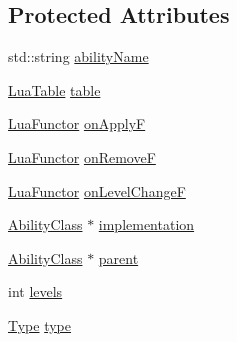 \subsection*{Protected Attributes}
\begin{DoxyCompactItemize}
\item 
std\+::string \hyperlink{classZeta_1_1AbilityClass_af998b8b5d45ef4853cfac4afe78aff4d}{ability\+Name}
\item 
\hyperlink{classZeta_1_1LuaTable}{Lua\+Table} \hyperlink{classZeta_1_1AbilityClass_a58065ca9d19ff9366c09bfc8d81abbac}{table}
\item 
\hyperlink{classZeta_1_1LuaFunctor}{Lua\+Functor} \hyperlink{classZeta_1_1AbilityClass_a74da9c30cf5040a98cfd8d69c90538cd}{on\+Apply\+F}
\item 
\hyperlink{classZeta_1_1LuaFunctor}{Lua\+Functor} \hyperlink{classZeta_1_1AbilityClass_ace27cfeff8dfc3e4af385d72a010f4b9}{on\+Remove\+F}
\item 
\hyperlink{classZeta_1_1LuaFunctor}{Lua\+Functor} \hyperlink{classZeta_1_1AbilityClass_a030755a406dea76a11609e1cca3a4ea3}{on\+Level\+Change\+F}
\item 
\hyperlink{classZeta_1_1AbilityClass}{Ability\+Class} $\ast$ \hyperlink{classZeta_1_1AbilityClass_a4a0d26c946a8b406ec6394849c931a51}{implementation}
\item 
\hyperlink{classZeta_1_1AbilityClass}{Ability\+Class} $\ast$ \hyperlink{classZeta_1_1AbilityClass_ad862e9ba14d23afb20786a1eeb2ca872}{parent}
\item 
int \hyperlink{classZeta_1_1AbilityClass_a8524be37623bb3ba701d9727be8ab042}{levels}
\item 
\hyperlink{classZeta_1_1AbilityClass_a371c2c662780f1c4a796a3332d6568b3}{Type} \hyperlink{classZeta_1_1AbilityClass_a4ffb80485a1b4321c6c243d80dce1ed5}{type}
\end{DoxyCompactItemize}


